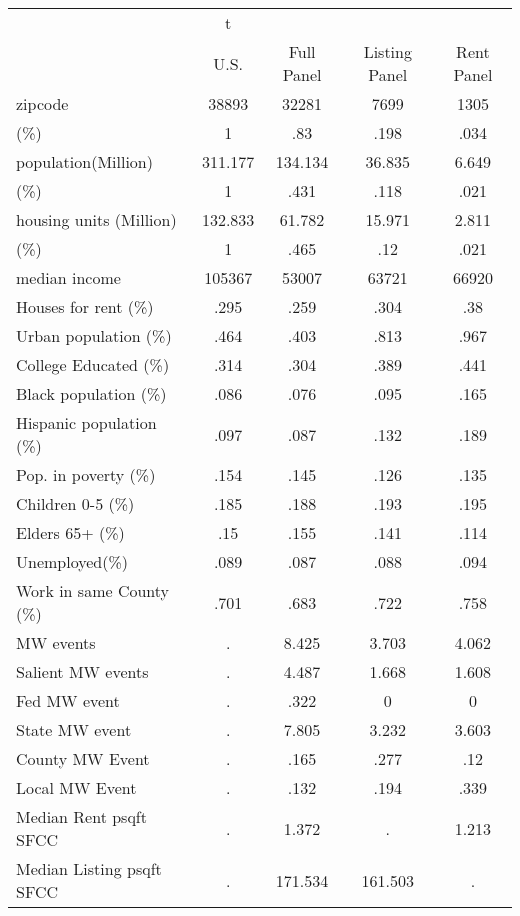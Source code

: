 \begin{tabular}{l*{4}{c}}
\hline\hline
            &           t&            &            &            \\
            &        U.S.&  Full Panel&Listing Panel&  Rent Panel\\
\hline
zipcode     &       38893&       32281&        7699&        1305\\
(\%)        &           1&         .83&        .198&        .034\\
population(Million)&     311.177&     134.134&      36.835&       6.649\\
(\%)        &           1&        .431&        .118&        .021\\
housing units (Million)&     132.833&      61.782&      15.971&       2.811\\
(\%)        &           1&        .465&         .12&        .021\\
median income&      105367&       53007&       63721&       66920\\
Houses for rent (\%)&        .295&        .259&        .304&         .38\\
Urban population (\%)&        .464&        .403&        .813&        .967\\
College Educated (\%)&        .314&        .304&        .389&        .441\\
Black population (\%)&        .086&        .076&        .095&        .165\\
Hispanic population (\%)&        .097&        .087&        .132&        .189\\
Pop. in poverty (\%)&        .154&        .145&        .126&        .135\\
Children 0-5 (\%)&        .185&        .188&        .193&        .195\\
Elders 65+ (\%)&         .15&        .155&        .141&        .114\\
Unemployed(\%)&        .089&        .087&        .088&        .094\\
Work in same County (\%)&        .701&        .683&        .722&        .758\\
MW events   &           .&       8.425&       3.703&       4.062\\
Salient MW events&           .&       4.487&       1.668&       1.608\\
Fed MW event&           .&        .322&           0&           0\\
State MW event&           .&       7.805&       3.232&       3.603\\
County MW Event&           .&        .165&        .277&         .12\\
Local MW Event&           .&        .132&        .194&        .339\\
Median Rent psqft SFCC&           .&       1.372&           .&       1.213\\
Median Listing psqft SFCC&           .&     171.534&     161.503&           .\\
\hline\hline
\end{tabular}

